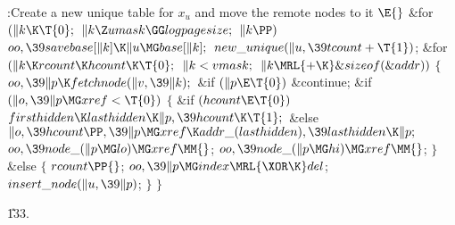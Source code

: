\Y\B\4:Create a new unique table for $x_u$ and move the remote nodes to it%
\X${}\E{}$\6
\&{for} ${}(\|k\K\T{0};{}$ ${}\|k\Z\\{umask}\GG\\{logpagesize};{}$ ${}\|k%
\PP){}$\1\5
${}\\{oo},\39\\{savebase}[\|k]\K\|u\MG\\{base}[\|k];{}$\2\6
${}\\{new\_unique}(\|u,\39\\{tcount}+\T{1}){}$;\6
\&{for} ${}(\|k\K\\{rcount}\K\\{hcount}\K\T{0};{}$ ${}\|k<\\{vmask};{}$ ${}\|k%
\MRL{+{\K}}\&{sizeof}(\&{addr})){}$\5
${}\{{}$\1\6
${}\\{oo},\39\|p\K\\{fetchnode}(\|v,\39\|k);{}$\6
\&{if} ${}(\|p\E\T{0}){}$\1\5
\&{continue};\2\6
\&{if} ${}(\|o,\39\|p\MG\\{xref}<\T{0}){}$\5
${}\{{}$\1\6
\&{if} ${}(\\{hcount}\E\T{0}){}$\1\5
${}\\{firsthidden}\K\\{lasthidden}\K\|p,\39\\{hcount}\K\T{1};{}$\2\6
\&{else}\1\5
${}\|o,\39\\{hcount}\PP,\39\|p\MG\\{xref}\K\\{addr\_}(\\{lasthidden}),\39%
\\{lasthidden}\K\|p;{}$\2\6
${}\\{oo},\39\\{node\_}(\|p\MG\\{lo})\MG\\{xref}\MM{}$;\6
${}\\{oo},\39\\{node\_}(\|p\MG\\{hi})\MG\\{xref}\MM{}$;\6
\4${}\}{}$\5
\2\&{else}\5
${}\{{}$\1\6
${}\\{rcount}\PP{}$;\6
${}\\{oo},\39\|p\MG\\{index}\MRL{{\XOR}{\K}}\\{del}{}$;\6
${}\\{insert\_node}(\|u,\39\|p){}$;\6
\4${}\}{}$\2\6
\4${}\}{}$\2\par
\U133.\fi

